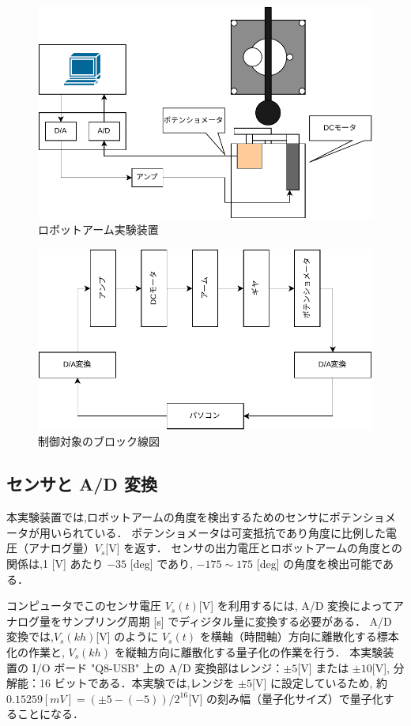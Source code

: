 \begin{figure}[h]
  \centering
  \includegraphics[scale=0.4]{sozai/1.pdf}
  \caption{ロボットアーム実験装置}
\end{figure}

\begin{figure}[h]
  \centering
  \includegraphics[scale=0.65]{sozai/2.pdf}
  \caption{制御対象のブロック線図}
\end{figure}

\subsection{センサと A/D 変換}

本実験装置では,ロボットアームの角度を検出するためのセンサにポテンショメータが用いられている．
ポテンショメータは可変抵抗であり角度に比例した電圧（アナログ量）\(V_s \)[V] を返す．
センサの出力電圧とロボットアームの角度との関係は,1 [V] あたり \(-35\) [deg] であり,
\(-175 \sim 175\) [deg] の角度を検出可能である．

コンピュータでこのセンサ電圧 \(V_s(t) \)[V] を利用するには,
A/D 変換によってアナログ量をサンプリング周期 [s] でディジタル量に変換する必要がある．
A/D 変換では,\(V_s(kh) \)[V] のように \(V_s(t)\) を横軸（時間軸）方向に離散化する標本化の作業と,
\(V_s(kh)\) を縦軸方向に離散化する量子化の作業を行う．
本実験装置の I/O ボード "Q8-USB" 上の A/D 変換部はレンジ：\(\pm 5 \)[V] または \(\pm 10 \)[V],
分解能：16 ビットである．本実験では,レンジを \(\pm 5 \)[V] に設定しているため,
約 \(0.15259 [mV] = (\pm 5 - (-5))/2^{16} \)[V] の刻み幅（量子化サイズ）で量子化することになる．

